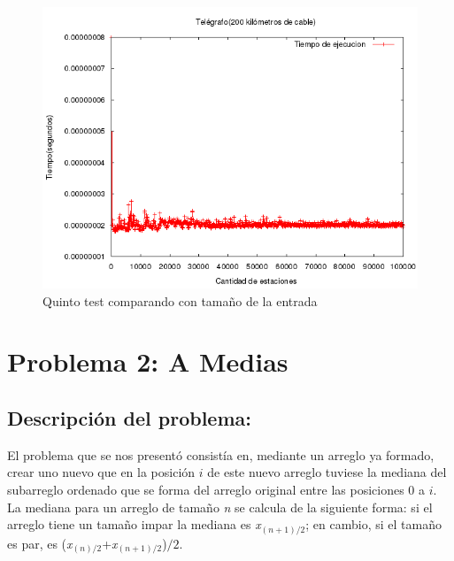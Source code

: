 \documentclass[10pt, a4paper]{article}
\begin{document}
\begin{enumerate}
	\begin{figure}[H]
  		\centering
   	 	\includegraphics[width=1\textwidth]
   	 	{Imagenes/telegrafoTiempos4Comparando.png}
		\caption{Quinto test comparando con tama\~no de la entrada}
	\end{figure}
	\end{enumerate}
\section{Problema 2: A Medias}
		\subsection{Descripci\'on del problema:}
		El problema que se nos present\'o consist\'ia en, mediante un arreglo ya formado, crear uno nuevo que en la posici\'on $i$ de este nuevo arreglo tuviese la mediana del subarreglo ordenado que se forma del arreglo original entre las posiciones 0 a $i$.
		\\ La mediana para un arreglo de tama\~no \textit{n}  se calcula de la siguiente forma: si el arreglo tiene un tama\~no impar la mediana es \textit{x$_{(n+1)/2}$}; en cambio, si el tama\~no es par, es (\textit{x$_{(n)/2}$}+\textit{x$_{(n+1)/2}$})$/2$.
\end{document}
